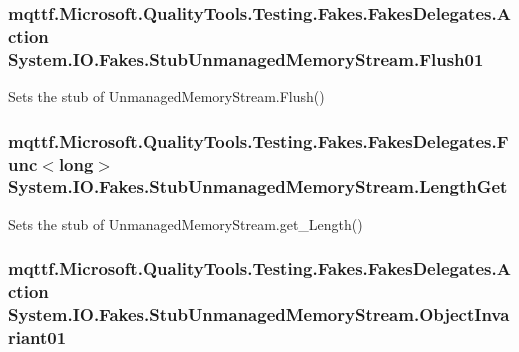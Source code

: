 \hypertarget{class_system_1_1_i_o_1_1_fakes_1_1_stub_unmanaged_memory_stream_af66c075ca0e942c925e197ba1550d897}{
\subsubsection[{Flush01}]{\setlength{\rightskip}{0pt plus 5cm}mqttf.\-Microsoft.\-Quality\-Tools.\-Testing.\-Fakes.\-Fakes\-Delegates.\-Action System.\-I\-O.\-Fakes.\-Stub\-Unmanaged\-Memory\-Stream.\-Flush01}}\label{class_system_1_1_i_o_1_1_fakes_1_1_stub_unmanaged_memory_stream_af66c075ca0e942c925e197ba1550d897}


Sets the stub of Unmanaged\-Memory\-Stream.\-Flush()

\hypertarget{class_system_1_1_i_o_1_1_fakes_1_1_stub_unmanaged_memory_stream_a71c3f5d0faf5a72dcd6192fd350b5103}{
\subsubsection[{Length\-Get}]{\setlength{\rightskip}{0pt plus 5cm}mqttf.\-Microsoft.\-Quality\-Tools.\-Testing.\-Fakes.\-Fakes\-Delegates.\-Func$<$long$>$ System.\-I\-O.\-Fakes.\-Stub\-Unmanaged\-Memory\-Stream.\-Length\-Get}}\label{class_system_1_1_i_o_1_1_fakes_1_1_stub_unmanaged_memory_stream_a71c3f5d0faf5a72dcd6192fd350b5103}


Sets the stub of Unmanaged\-Memory\-Stream.\-get\-\_\-\-Length()

\hypertarget{class_system_1_1_i_o_1_1_fakes_1_1_stub_unmanaged_memory_stream_a58a59182bcb27c1f6116a74b709ae9e4}{
\subsubsection[{Object\-Invariant01}]{\setlength{\rightskip}{0pt plus 5cm}mqttf.\-Microsoft.\-Quality\-Tools.\-Testing.\-Fakes.\-Fakes\-Delegates.\-Action System.\-I\-O.\-Fakes.\-Stub\-Unmanaged\-Memory\-Stream.\-Object\-Invariant01}}\label{class_system_1_1_i_o_1_1_fakes_1_1_stub_unmanaged_memory_stream_a58a59182bcb27c1f6116a74b709ae9e4}


